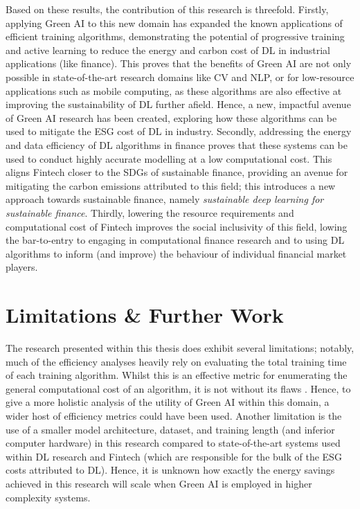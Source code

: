 \documentclass[a4paper, 11pt]{report}
\begin{document}
    Based on these results, the contribution of this research is threefold. Firstly, applying Green AI to this new domain has expanded the known applications of efficient training algorithms, demonstrating the potential of progressive training and active learning to reduce the energy and carbon cost of DL in industrial applications (like finance). This proves that the benefits of Green AI are not only possible in state-of-the-art research domains like CV and NLP, or for low-resource applications such as mobile computing, as these algorithms are also effective at improving the sustainability of DL further afield. Hence, a new, impactful avenue of Green AI research has been created, exploring how these algorithms can be used to mitigate the ESG cost of DL in industry. Secondly, addressing the energy and data efficiency of DL algorithms in finance proves that these systems can be used to conduct highly accurate modelling at a low computational cost. This aligns Fintech closer to the SDGs of sustainable finance, providing an avenue for mitigating the carbon emissions attributed to this field; this introduces a new approach towards sustainable finance, namely \emph{sustainable deep learning for sustainable finance}. Thirdly, lowering the resource requirements and computational cost of Fintech improves the social inclusivity of this field, lowing the bar-to-entry to engaging in computational finance research and to using DL algorithms to inform (and improve) the behaviour of individual financial market players.


    \section{Limitations \& Further Work}

    The research presented within this thesis does exhibit several limitations; notably, much of the efficiency analyses heavily rely on evaluating the total training time of each training algorithm. Whilst this is an effective metric for enumerating the general computational cost of an algorithm, it is not without its flaws \citep{schwartz-2019}. Hence, to give a more holistic analysis of the utility of Green AI within this domain, a wider host of efficiency metrics could have been used. Another limitation is the use of a smaller model architecture, dataset, and training length (and inferior computer hardware) in this research compared to state-of-the-art systems used within DL research and Fintech (which are responsible for the bulk of the ESG costs attributed to DL). Hence, it is unknown how exactly the energy savings achieved in this research will scale when Green AI is employed in higher complexity systems. 
\end{document}
